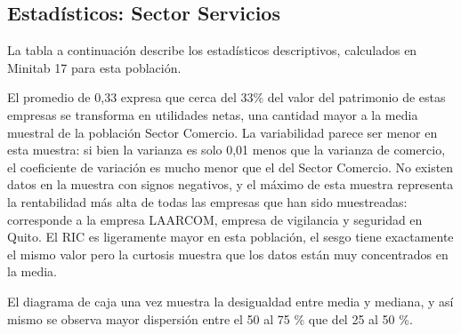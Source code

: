 \documentclass[12pt,a4paper,twoside]{article}
\begin{document}
\subsection{Estadísticos: Sector Servicios}
La tabla a continuación describe los estadísticos descriptivos, calculados en Minitab 17 para esta población. \par
\begin{figure}[H]
\end{figure}
El promedio de 0,33 expresa que cerca del 33\% del valor del patrimonio de estas empresas se transforma en utilidades netas, una cantidad mayor a la media muestral de la población Sector Comercio. La variabilidad parece ser menor en esta muestra: si bien la varianza es solo 0,01 menos que la varianza de comercio, el coeficiente de variación es mucho menor que el del Sector Comercio. No existen datos en la muestra con signos negativos, y el máximo de esta muestra representa la rentabilidad más alta de todas las empresas que han sido muestreadas: corresponde a la empresa LAARCOM, empresa de vigilancia y seguridad en Quito. El RIC es ligeramente mayor en esta población, el sesgo tiene exactamente el mismo valor pero la curtosis muestra que los datos están muy concentrados en la media. \par
\begin{figure}[H]
\end{figure}
El diagrama de caja una vez muestra la desigualdad entre media y mediana, y así mismo se observa mayor dispersión entre el 50 al 75 \% que del 25 al 50 \%.
\end{document}
